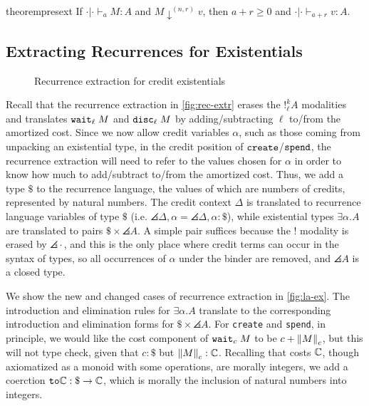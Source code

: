 \begin{restatable}[Preservation]{theorem}{presext}\label{thm:pres-ext}
If $\cdot | \cdot \vdash_a M : A$ and $M \downarrow^{(n,r)} v$, then $a + r \geq 0$ and $\cdot | \cdot \vdash_{a + r} v : A$.
\end{restatable}

\subsection{Extracting Recurrences for Existentials}
\begin{figure}
  
  \caption{Recurrence extraction for credit existentials}
  \label{fig:la-ex}
\end{figure}

Recall that the recurrence extraction in \autoref{fig:rec-extr}
erases the $!^k_\ell A$ modalities and translates $\texttt{wait}_{\ell} \; M$ and $\texttt{disc}_{\ell} \; M$ by adding/subtracting $\ell$ to/from the amortized cost.
Since we now allow credit variables $\alpha$, such as those coming from unpacking an existential type, in the credit position of $\texttt{create}$/$\texttt{spend}$, the recurrence extraction will need to refer to the values chosen for $\alpha$ in order to know how much to add/subtract to/from the amortized cost.
Thus, we add a type $\$$ to the recurrence language, the values of which are numbers of credits, represented by natural numbers.  The credit context $\Delta$ is translated to recurrence language variables of type $\$$
(i.e. $\angles{\Delta,\alpha} = \angles{\Delta},\alpha : \$$), while existential types $\exists \alpha.A$ are translated to pairs  $\$ \times \angles{A}$.  A simple pair suffices because the $!$ modality is erased by $\angles{\cdot}$, and this is the only place where credit terms can occur in the syntax of types, so all occurrences of $\alpha$ under the binder are removed, and $\angles{A}$ is a closed type.

We show the new and changed cases of recurrence extraction in \autoref{fig:la-ex}.  The introduction and elimination rules for $\exists \alpha . A$ translate to the corresponding introduction and elimination forms for $\$ \times \angles{A}$.
For \texttt{create} and \texttt{spend}, in principle, we would like the cost component of $\texttt{wait}_{c} \; M$ to be $c + \left\lVert M\right\rVert_c$, but this will not type check, given that $c : \$$ but $\left\lVert M\right\rVert_c : \mathbb{C}$.
Recalling that costs $\mathbb{C}$, though axiomatized as a monoid with some operations, are morally integers, we add a coerction $\texttt{to}\mathbb{C} : \$ \to \mathbb{C}$, which is morally the inclusion of natural numbers into integers.

